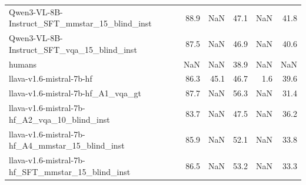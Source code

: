 \begin{tabular}{lrrrrr}
Qwen3-VL-8B-Instruct_SFT_mmstar_15_blind_inst & 88.9 & NaN & 47.1 & NaN & 41.8 \\
Qwen3-VL-8B-Instruct_SFT_vqa_15_blind_inst & 87.5 & NaN & 46.9 & NaN & 40.6 \\
humans & NaN & NaN & 38.9 & NaN & NaN \\
llava-v1.6-mistral-7b-hf & 86.3 & 45.1 & 46.7 & 1.6 & 39.6 \\
llava-v1.6-mistral-7b-hf_A1_vqa_gt & 87.7 & NaN & 56.3 & NaN & 31.4 \\
llava-v1.6-mistral-7b-hf_A2_vqa_10_blind_inst & 83.7 & NaN & 47.5 & NaN & 36.2 \\
llava-v1.6-mistral-7b-hf_A4_mmstar_15_blind_inst & 85.9 & NaN & 52.1 & NaN & 33.8 \\
llava-v1.6-mistral-7b-hf_SFT_mmstar_15_blind_inst & 86.5 & NaN & 53.2 & NaN & 33.3 \\
\bottomrule
\end{tabular}
